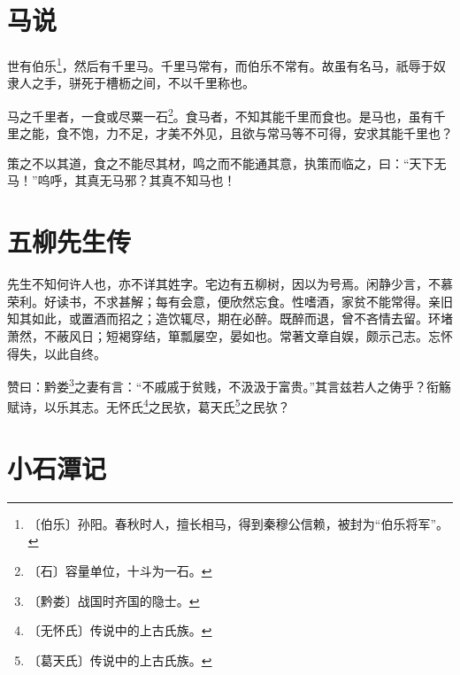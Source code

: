 \documentclass[12pt,UTF-8,openany]{ctexbook}
\begin{document}
\chapter{马说}

\begin{normalsize}
    
    世有伯乐\footnote{〔伯乐〕孙阳。春秋时人，擅长相马，得到秦穆公信赖，被封为“伯乐将军”。}，然后有千里马。千里马常有，而伯乐不常有。故虽有名马，祇辱于奴隶人之手，骈死于槽枥之间，不以千里称也。
    
    马之千里者，一食或尽粟一石\footnote{〔石〕容量单位，十斗为一石。}。食马者，不知其能千里而食也。是马也，虽有千里之能，食不饱，力不足，才美不外见，且欲与常马等不可得，安求其能千里也？
    
    策之不以其道，食之不能尽其材，鸣之而不能通其意，执策而临之，曰：“天下无马！”呜呼，其真无马邪？其真不知马也！
\end{normalsize}



\chapter{五柳先生传}

\begin{normalsize}
    
    先生不知何许人也，亦不详其姓字。宅边有五柳树，因以为号焉。闲静少言，不慕荣利。好读书，不求甚解；每有会意，便欣然忘食。性嗜酒，家贫不能常得。亲旧知其如此，或置酒而招之；造饮辄尽，期在必醉。既醉而退，曾不吝情去留。环堵萧然，不蔽风日；短褐穿结，箪瓢屡空，晏如也。常著文章自娱，颇示己志。忘怀得失，以此自终。
    
    赞曰：黔娄\footnote{〔黔娄〕战国时齐国的隐士。}之妻有言：“不戚戚于贫贱，不汲汲于富贵。”其言兹若人之俦乎？衔觞赋诗，以乐其志。无怀氏\footnote{〔无怀氏〕传说中的上古氏族。}之民欤，葛天氏\footnote{〔葛天氏〕传说中的上古氏族。}之民欤？
\end{normalsize}



\chapter{小石潭记}
\end{document}
